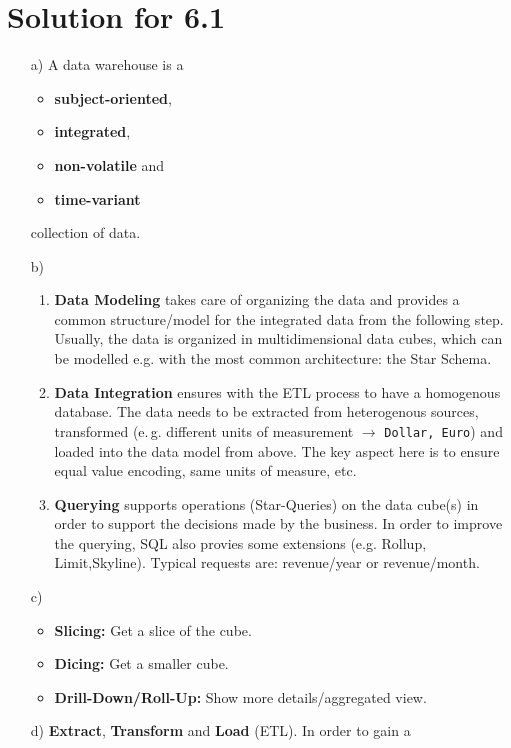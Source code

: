 \documentclass{scrartcl}
\begin{document}
\section*{Solution for 6.1}

\begin{itemize}
	\item[a)]
		A data warehouse is a 
		\begin{itemize}
			\item \textbf{subject-oriented}, 
			\item \textbf{integrated}, 
			\item \textbf{non-volatile} and 
			\item \textbf{time-variant}
		\end{itemize}
		collection of data.
	\item[b)] \mbox{}
	\begin{enumerate}
		\item \textbf{Data Modeling} takes care of \glqq{}organizing\grqq{} the data and provides a common structure/model  for the integrated data from the following step. Usually, the data is organized in multidimensional data cubes, which can be modelled e.g. with the most common architecture: the Star Schema. 
		\item \textbf{Data Integration} ensures with the ETL process to have a homogenous database. The data needs to be extracted from heterogenous sources, transformed (e.\,g. different units of measurement $\rightarrow$ \texttt{Dollar, Euro}) and loaded into the data model from above. The key aspect here is to ensure equal value encoding, same units of measure, etc.  
		\item \textbf{Querying} supports operations (Star-Queries) on the data cube(s) in order to support the decisions made by
			the business. In order to improve the querying, SQL also provies some extensions (e.g. Rollup, Limit,Skyline). Typical requests are: revenue/year or revenue/month.
	\end{enumerate}
	\item[c)] \mbox{}
		\begin{itemize}
			\item \textbf{Slicing:} Get a slice of the cube.
			\item \textbf{Dicing:} Get a smaller cube.
			\item \textbf{Drill-Down/Roll-Up:} Show more details/aggregated view.
		\end{itemize}
	\item[d)]
		\textbf{Extract}, \textbf{Transform} and \textbf{Load} (ETL). In order to gain a

\end{itemize}
\end{document}
